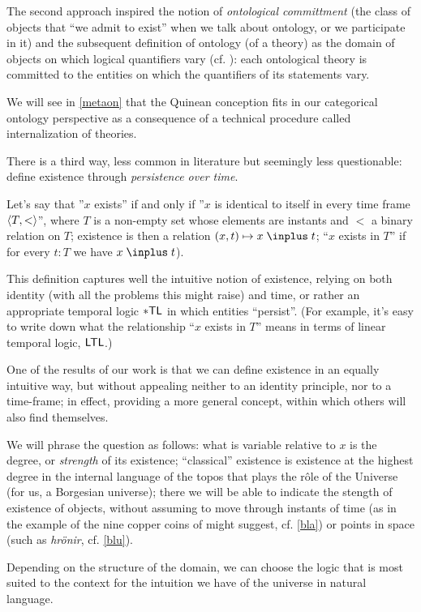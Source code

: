 The second approach inspired the notion of \emph{ontological committment} (the class of objects that ``we admit to exist'' when we talk about ontology, or we participate in it) and the subsequent definition of ontology (of a theory) as the domain of objects on which logical quantifiers vary (cf. \cite{}): each ontological theory is committed to the entities on which the quantifiers of its statements vary.

We will see in \autoref{metaon} that the Quinean conception fits in our categorical ontology perspective as a consequence of a technical procedure called internalization of theories.

There is a third way, less common in literature but seemingly less questionable: define existence through \emph{persistence over time}. 

Let's say that ''$x$ exists'' if and only if ''$x$ is identical to itself in every time frame $\langle T, <\rangle$'', where $T$ is a non-empty set whose elements are instants and $<$ a binary relation on $T$; existence is then a relation $ (x, t) \mapsto x \mathrel \inplus t $; ``$ x $ exists in $ T $'' if for every $ t: T $ we have $ x \mathrel \inplus t $).

This definition captures well the intuitive notion of existence, relying  on both identity (with all the problems this might raise) and time, or rather an appropriate temporal logic $\sf *TL$ in which entities ``persist''. (For example, it's easy to write down what the relationship ``$x$ exists in $T$'' means in terms of linear temporal logic, $\sf LTL$.)

One of the results of our work is that we can define existence in an equally intuitive way, but  without appealing neither to an identity principle, nor to a time-frame; in effect, providing a more general concept, within which others will also find themselves.

We will phrase the question as follows: what is variable relative to $x$ is the degree, or \emph{strength} of its existence; ``classical'' existence is existence at the highest degree in the internal language of the topos that plays the r\^ole of the Universe (for us, a Borgesian universe); there we will be able to indicate the stength of existence of objects, without assuming to move through instants of time (as in the example of the nine copper coins of \cite{tlonEN} might suggest, cf. \autoref{bla}) or points in space (such as \emph{hr\"onir}, cf. \autoref{blu}).

Depending on the structure of the domain, we can choose the logic that is most suited to the context for the intuition we have of the universe in natural language.

